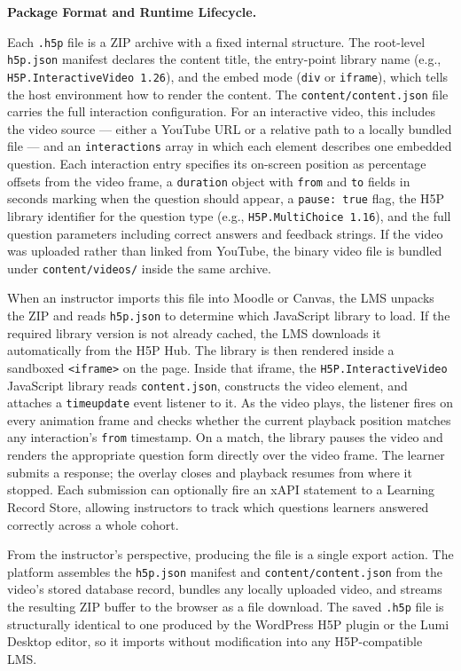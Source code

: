 \textbf{Package Format and Runtime Lifecycle.}

Each \texttt{.h5p} file is a ZIP archive with a fixed internal structure. The root-level \texttt{h5p.json} manifest declares the content title, the entry-point library name (e.g., \texttt{H5P.InteractiveVideo 1.26}), and the embed mode (\texttt{div} or \texttt{iframe}), which tells the host environment how to render the content. The \texttt{content/content.json} file carries the full interaction configuration. For an interactive video, this includes the video source --- either a YouTube URL or a relative path to a locally bundled file --- and an \texttt{interactions} array in which each element describes one embedded question. Each interaction entry specifies its on-screen position as percentage offsets from the video frame, a \texttt{duration} object with \texttt{from} and \texttt{to} fields in seconds marking when the question should appear, a \texttt{pause: true} flag, the H5P library identifier for the question type (e.g., \texttt{H5P.MultiChoice 1.16}), and the full question parameters including correct answers and feedback strings. If the video was uploaded rather than linked from YouTube, the binary video file is bundled under \texttt{content/videos/} inside the same archive.

When an instructor imports this file into Moodle or Canvas, the LMS unpacks the ZIP and reads \texttt{h5p.json} to determine which JavaScript library to load. If the required library version is not already cached, the LMS downloads it automatically from the H5P Hub. The library is then rendered inside a sandboxed \texttt{<iframe>} on the page. Inside that iframe, the \texttt{H5P.InteractiveVideo} JavaScript library reads \texttt{content.json}, constructs the video element, and attaches a \texttt{timeupdate} event listener to it. As the video plays, the listener fires on every animation frame and checks whether the current playback position matches any interaction's \texttt{from} timestamp. On a match, the library pauses the video and renders the appropriate question form directly over the video frame. The learner submits a response; the overlay closes and playback resumes from where it stopped. Each submission can optionally fire an xAPI statement to a Learning Record Store, allowing instructors to track which questions learners answered correctly across a whole cohort.

From the instructor's perspective, producing the file is a single export action. The platform assembles the \texttt{h5p.json} manifest and \texttt{content/content.json} from the video's stored database record, bundles any locally uploaded video, and streams the resulting ZIP buffer to the browser as a file download. The saved \texttt{.h5p} file is structurally identical to one produced by the WordPress H5P plugin or the Lumi Desktop editor, so it imports without modification into any H5P-compatible LMS.


